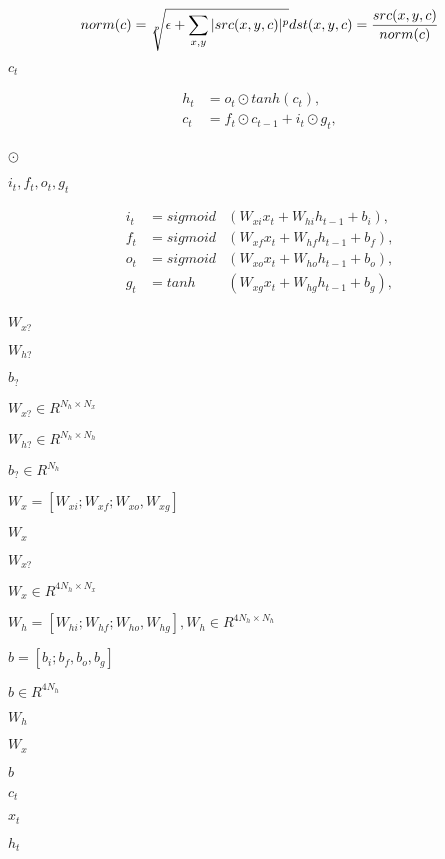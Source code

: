 \documentclass{article}
\begin{document}
\[ norm(c) = \sqrt[p]{\epsilon + \sum_{x, y} |src(x, y, c)|^p } \\ dst(x, y, c) = \frac{ src(x, y, c) }{norm(c)} \]
\pagebreak

$c_t$
\pagebreak

\begin{eqnarray*} h_t &= o_t \odot tanh(c_t), \\ c_t &= f_t \odot c_{t-1} + i_t \odot g_t, \\ \end{eqnarray*}
\pagebreak

$\odot$
\pagebreak

$i_t, f_t, o_t, g_t$
\pagebreak

\begin{eqnarray*} i_t &= sigmoid&(W_{xi} x_t + W_{hi} h_{t-1} + b_i), \\ f_t &= sigmoid&(W_{xf} x_t + W_{hf} h_{t-1} + b_f), \\ o_t &= sigmoid&(W_{xo} x_t + W_{ho} h_{t-1} + b_o), \\ g_t &= tanh &(W_{xg} x_t + W_{hg} h_{t-1} + b_g), \\ \end{eqnarray*}
\pagebreak

$W_{x?}$
\pagebreak

$W_{h?}$
\pagebreak

$b_{?}$
\pagebreak

$W_{x?} \in R^{N_h \times N_x}$
\pagebreak

$W_{h?} \in R^{N_h \times N_h}$
\pagebreak

$b_? \in R^{N_h}$
\pagebreak

$ W_x = [W_{xi}; W_{xf}; W_{xo}, W_{xg}] $
\pagebreak

$W_x$
\pagebreak

$ W_{x?} $
\pagebreak

$ W_x \in R^{4N_h \times N_x} $
\pagebreak

$ W_h = [W_{hi}; W_{hf}; W_{ho}, W_{hg}], W_h \in R^{4N_h \times N_h} $
\pagebreak

$ b = [b_i; b_f, b_o, b_g]$
\pagebreak

$b \in R^{4N_h} $
\pagebreak

$ W_h $
\pagebreak

$ W_x $
\pagebreak

$ b $
\pagebreak

$ c_t $
\pagebreak

$ x_t $
\pagebreak

$ h_t $
\pagebreak
\end{document}
